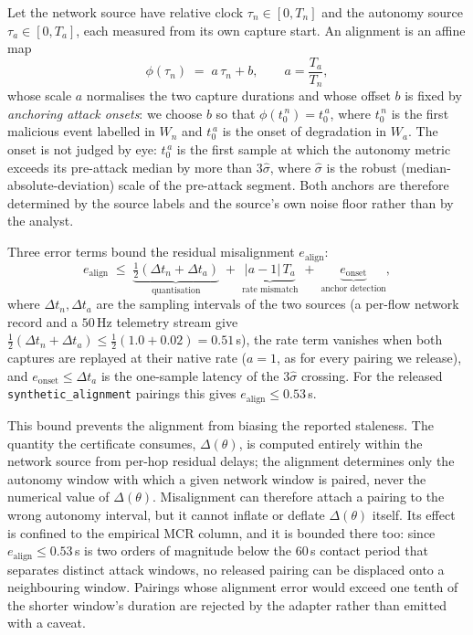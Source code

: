 \documentclass[conference,letterpaper,10pt]{IEEEtran}   %
\newcommand{\code}[1]{\texttt{#1}}
\begin{document}
Let the network source have relative clock $\tau_n\in[0,T_n]$ and the autonomy
source $\tau_a\in[0,T_a]$, each measured from its own capture start. An
alignment is an affine map
\begin{equation}
\label{eq:align}
\phi(\tau_n) \;=\; a\,\tau_n + b, \qquad a=\frac{T_a}{T_n},
\end{equation}
whose scale $a$ normalises the two capture durations and whose offset $b$ is
fixed by \emph{anchoring attack onsets}: we choose $b$ so that
$\phi(t_0^{\,n}) = t_0^{\,a}$, where $t_0^{\,n}$ is the first malicious event
labelled in $W_n$ and $t_0^{\,a}$ is the onset of degradation in $W_a$. The
onset is not judged by eye: $t_0^{\,a}$ is the first sample at which the
autonomy metric exceeds its pre-attack median by more than $3\hat\sigma$, where
$\hat\sigma$ is the robust (median-absolute-deviation) scale of the pre-attack
segment. Both anchors are therefore determined by the source labels and the
source's own noise floor rather than by the analyst.

Three error terms bound the residual misalignment $e_{\mathrm{align}}$:
\begin{equation}
\label{eq:align_err}
e_{\mathrm{align}} \;\le\; \underbrace{\tfrac{1}{2}(\Delta t_n+\Delta t_a)}_{\text{quantisation}}
\;+\;\underbrace{|a-1|\,T_a}_{\text{rate mismatch}}
\;+\;\underbrace{e_{\mathrm{onset}}}_{\text{anchor detection}},
\end{equation}
where $\Delta t_n,\Delta t_a$ are the sampling intervals of the two sources (a
per-flow network record and a $50$\,Hz telemetry stream give
$\tfrac12(\Delta t_n+\Delta t_a)\le\tfrac12(1.0+0.02)=0.51$\,s), the rate term
vanishes when both captures are replayed at their native rate ($a=1$, as for
every pairing we release), and $e_{\mathrm{onset}}\le\Delta t_a$ is the
one-sample latency of the $3\hat\sigma$ crossing. For the released
\code{synthetic\_alignment} pairings this gives
$e_{\mathrm{align}}\le0.53$\,s.

This bound prevents the alignment from biasing the reported staleness. The
quantity the certificate consumes, $\Delta(\theta)$, is computed entirely within
the network source from per-hop residual delays; the alignment determines only
the autonomy window with which a given network window is paired, never the
numerical value of $\Delta(\theta)$. Misalignment can therefore attach a pairing
to the wrong autonomy interval, but it cannot inflate or deflate $\Delta(\theta)$
itself. Its effect is confined to the empirical MCR column, and it is bounded
there too: since $e_{\mathrm{align}}\le0.53$\,s is two orders of magnitude
below the $60$\,s contact period that separates distinct attack windows, no
released pairing can be displaced onto a neighbouring window. Pairings whose
alignment error would exceed one tenth of the shorter window's duration are
rejected by the adapter rather than emitted with a caveat.
\end{document}
